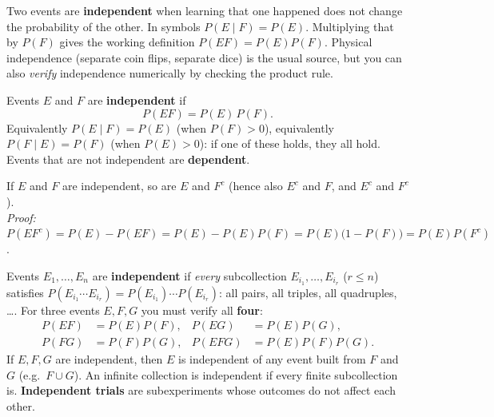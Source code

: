 \documentclass[11pt]{article}
\begin{document}
\begin{ideabox}
Two events are \textbf{independent} when learning that one happened does not change the probability of the other. In symbols $P(E\mid F)=P(E)$. Multiplying that by $P(F)$ gives the working definition $P(EF)=P(E)P(F)$. Physical independence (separate coin flips, separate dice) is the usual source, but you can also \emph{verify} independence numerically by checking the product rule.
\end{ideabox}

\begin{defbox}
Events $E$ and $F$ are \textbf{independent} if
\[ P(EF)=P(E)\,P(F). \]
Equivalently $P(E\mid F)=P(E)$ (when $P(F)>0$), equivalently $P(F\mid E)=P(F)$ (when $P(E)>0$): if one of these holds, they all hold. Events that are not independent are \textbf{dependent}.
\end{defbox}

\begin{thmbox}
If $E$ and $F$ are independent, so are $E$ and $F^c$ (hence also $E^c$ and $F$, and $E^c$ and $F^c$).\\
\emph{Proof:} $P(EF^c)=P(E)-P(EF)=P(E)-P(E)P(F)=P(E)\big(1-P(F)\big)=P(E)P(F^c)$.
\end{thmbox}

\begin{defbox}
Events $E_1,\dots,E_n$ are \textbf{independent} if \emph{every} subcollection $E_{i_1},\dots,E_{i_r}$ ($r\le n$) satisfies $P(E_{i_1}\cdots E_{i_r})=P(E_{i_1})\cdots P(E_{i_r})$: all pairs, all triples, all quadruples, \dots. For three events $E,F,G$ you must verify all \textbf{four}:
\begin{align*}
P(EF)&=P(E)P(F), & P(EG)&=P(E)P(G),\\
P(FG)&=P(F)P(G), & P(EFG)&=P(E)P(F)P(G).
\end{align*}
If $E,F,G$ are independent, then $E$ is independent of any event built from $F$ and $G$ (e.g.\ $F\cup G$). An infinite collection is independent if every finite subcollection is. \textbf{Independent trials} are subexperiments whose outcomes do not affect each other.
\end{defbox}
\end{document}
